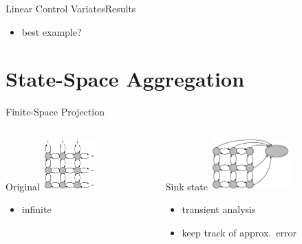 \documentclass[10pt]{beamer}
\begin{document}
\begin{frame}{Linear Control Variates}{Results}
  \begin{itemize}
    \item best example?
  \end{itemize}
\end{frame}

\section{State-Space Aggregation}
\begin{frame}{Finite-Space Projection}
    \begin{columns}
        \begin{column}{.30\textwidth}
            \begin{block}{Original}
                \centering
                \vspace{3mm}
                \includegraphics[height=2cm]{../gfx/state_space_untrunc.pdf}
                {\small
                \begin{itemize}
                    \item infinite
                \end{itemize}
                }
            \end{block}
        \end{column}
        \begin{column}{.30\textwidth}
            \begin{block}{Sink state}
                \centering
                \vspace{3mm}
                \includegraphics[height=2cm]{../gfx/state_space_redirected.pdf}
                {\small
                \begin{itemize}
                    \item transient analysis
                    \item keep track of approx.\ error
                \end{itemize}
                }

\end{block}
\end{column}
\end{columns}
\end{frame}
\end{document}
